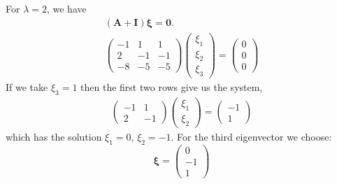{\begin{Solution}
\begin{enumerate}
    For $\lambda = 2$, we have
    \begin{gather*}
      ( \mathbf{A}  + \mathbf{I} ) \boldsymbol{\xi} = \mathbf{0}. \\
      \begin{pmatrix}
        -1 & 1 & 1 \\
        2 & -1 & -1 \\
        -8 & -5 & -5 
      \end{pmatrix}
      \begin{pmatrix}
        \xi_1 \\
        \xi_2 \\
        \xi_3
      \end{pmatrix}
      =
      \begin{pmatrix}
        0 \\
        0 \\
        0
      \end{pmatrix}
    \end{gather*}
    If we take $\xi_3 = 1$ then the first two rows give us the system,
    \begin{gather*}
      \begin{pmatrix}
        -1 & 1 \\
        2 & -1 
      \end{pmatrix}
      \begin{pmatrix}
        \xi_1 \\
        \xi_2 
      \end{pmatrix}
      =
      \begin{pmatrix}
        -1 \\
        1 
      \end{pmatrix}
    \end{gather*}
    which has the solution $\xi_1 = 0$, $\xi_2 = -1$.  For the third 
    eigenvector we choose:
    \[
    \boldsymbol{\xi} = 
    \begin{pmatrix}
      0 \\
      -1 \\
      1
    \end{pmatrix}
    \]


\end{enumerate}
\end{Solution}}
